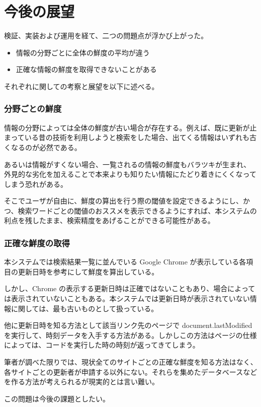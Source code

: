 \section{今後の展望}

検証、実装および運用を経て、二つの問題点が浮かび上がった。

\begin{itemize}
  \item 情報の分野ごとに全体の鮮度の平均が違う
  \item 正確な情報の鮮度を取得できないことがある
\end{itemize}

それぞれに関しての考察と展望を以下に述べる。

\subsubsection{分野ごとの鮮度}

情報の分野によっては全体の鮮度が古い場合が存在する。例えば、既に更新が止まっている昔の技術を利用しようと検索をした場合、出てくる情報はいずれも古くなるのが必然である。

あるいは情報がすくない場合、一覧されるの情報の鮮度もバラツキが生まれ、外見的な劣化を加えることで本来よりも知りたい情報にたどり着きにくくなってしまう恐れがある。

そこでユーザが自由に、鮮度の算出を行う際の閾値を設定できるようにし、かつ、検索ワードごとの閾値のおススメを表示できるようにすれば、本システムの利点を残したまま、検索精度をあげることができる可能性がある。

\subsubsection{正確な鮮度の取得}

本システムでは検索結果一覧に並んでいる Google Chrome が表示している各項目の更新日時を参考にして鮮度を算出している。

しかし、Chrome の表示する更新日時は正確ではないこともあり、場合によっては表示されていないこともある。本システムでは更新日時が表示されていない情報に関しては、最も古いものとして扱っている。

他に更新日時を知る方法として該当リンク先のページで document.lastModified を実行して、時刻データを入手する方法がある。しかしこの方法はページの仕様によっては、コードを実行した時の時刻が返ってきてしまう。

筆者が調べた限りでは、現状全てのサイトごとの正確な鮮度を知る方法はなく、各サイトごとの更新者が申請する以外にない。それらを集めたデータベースなどを作る方法が考えられるが現実的とは言い難い。

この問題は今後の課題としたい。
